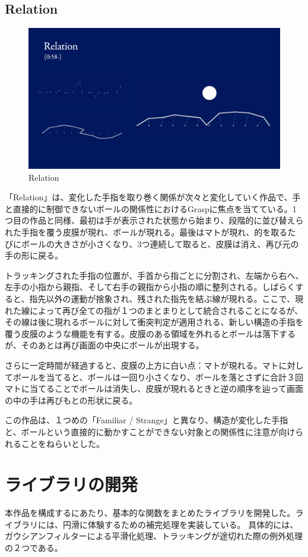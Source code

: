 \subsection*{Relation}
\begin{figure}[H]
  \centering
  \includegraphics[width=15cm]{img/relation.png}
  \caption{Relation}
  \label{fig:relation}
\end{figure}
「Relation」は、変化した手指を取り巻く関係が次々と変化していく作品で、手と直接的に制御できないボールの関係性におけるGraspに焦点を当てている。1つ目の作品と同様、最初は手が表示された状態から始まり、段階的に並び替えられた手指を覆う皮膜が現れ、ボールが現れる。最後はマトが現れ、的を取るたびにボールの大きさが小さくなり、3つ連続して取ると、皮膜は消え、再び元の手の形に戻る。

トラッキングされた手指の位置が、手首から指ごとに分割され、左端から右へ、左手の小指から親指、そして右手の親指から小指の順に整列される。しばらくすると、指先以外の運動が捨象され、残された指先を結ぶ線が現れる。ここで、現れた線によって再び全ての指が１つのまとまりとして統合されることになるが、その線は後に現れるボールに対して衝突判定が適用される、新しい構造の手指を覆う皮膜のような機能を有する。皮膜のある領域を外れるとボールは落下するが、そのあとは再び画面の中央にボールが出現する。

さらに一定時間が経過すると、皮膜の上方に白い点：マトが現れる。マトに対してボールを当てると、ボールは一回り小さくなり、ボールを落とさずに合計３回マトに当てることでボールは消失し、皮膜が現れるときと逆の順序を辿って画面の中の手は再びもとの形状に戻る。

この作品は、１つめの「Familiar / Strange」と異なり、構造が変化した手指と、ボールという直接的に動かすことができない対象との関係性に注意が向けられることをねらいとした。

\section{ライブラリの開発}
本作品を構成するにあたり、基本的な関数をまとめたライブラリを開発した。ライブラリには、円滑に体験するための補完処理を実装している。
具体的には、ガウシアンフィルターによる平滑化処理、トラッキングが途切れた際の例外処理の２つである。

